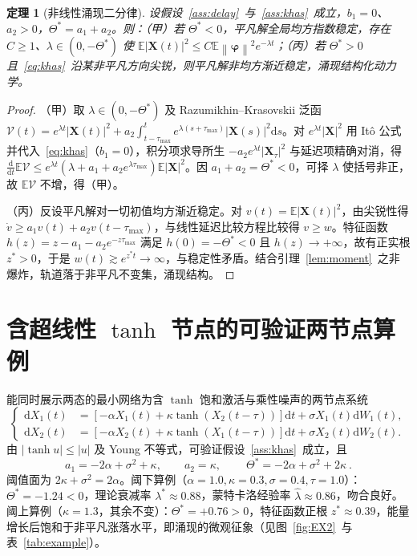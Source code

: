 \documentclass[12pt,a4paper]{ctexart}
\newcommand{\kai}[1]{{\CJKfamily{kai}#1}}
\newtheorem{theorem}{定理}
\newcommand{\E}{\mathbb{E}}
\newcommand{\dd}{\mathrm{d}}
\newcommand{\norm}[1]{\left\lVert #1 \right\rVert}
\newcommand{\abs}[1]{\left\lvert #1 \right\rvert}
\newcommand{\X}{\mathbf{X}}
\begin{document}
\begin{theorem}[非线性涌现二分律]\label{thm:nonlinear}
设假设~\ref{ass:delay}~与~\ref{ass:khas}~成立，$b_1=0$、$a_2>0$，$\Theta^{\ast}=a_1+a_2$。则：（甲）若 $\Theta^{\ast}<0$，平凡解全局均方指数稳定，存在 $C\ge1$、$\lambda\in(0,-\Theta^{\ast})$ 使 $\E\abs{\X(t)}^2\le C\E\norm{\bm{\varphi}}^2 e^{-\lambda t}$；（丙）若 $\Theta^{\ast}>0$ 且~\eqref{eq:khas}~沿某非平凡方向尖锐，则平凡解非均方渐近稳定，涌现结构化动力学。
\end{theorem}

\begin{proof}
\kai{（甲）}取 $\lambda\in(0,-\Theta^\ast)$ 及 Razumikhin–Krasovskii 泛函
$\mathcal{V}(t)=e^{\lambda t}\abs{\X(t)}^2+a_2\int_{t-\tau_{\max}}^{t}e^{\lambda(s+\tau_{\max})}\abs{\X(s)}^2\dd s$。对 $e^{\lambda t}\abs{\X}^2$ 用 Itô 公式并代入~\eqref{eq:khas}（$b_1=0$），积分项求导所生 $-a_2e^{\lambda t}\abs{\X_\tau}^2$ 与延迟项\kai{精确对消}，得 $\tfrac{\dd}{\dd t}\E\mathcal{V}\le e^{\lambda t}(\lambda+a_1+a_2 e^{\lambda\tau_{\max}})\E\abs{\X}^2$。因 $a_1+a_2=\Theta^\ast<0$，可择 $\lambda$ 使括号非正，故 $\E\mathcal{V}$ 不增，得（甲）。

\kai{（丙）}反设平凡解对一切初值均方渐近稳定。对 $v(t)=\E\abs{\X(t)}^2$，由尖锐性得 $\dot v\ge a_1 v(t)+a_2 v(t-\tau_{\max})$，与线性延迟比较方程比较得 $v\ge w$。特征函数 $h(z)=z-a_1-a_2 e^{-z\tau_{\max}}$ 满足 $h(0)=-\Theta^\ast<0$ 且 $h(z)\to+\infty$，故有正实根 $z^\ast>0$，于是 $w(t)\gtrsim e^{z^\ast t}\to\infty$，与稳定性矛盾。结合引理~\ref{lem:moment}~之非爆炸，轨道落于非平凡不变集，涌现结构。
\end{proof}

\section{含超线性 $\tanh$ 节点的可验证两节点算例}\label{sec:example}

\hspace{2em}能同时展示两态的最小网络为含 $\tanh$ 饱和激活与乘性噪声的两节点系统
\begin{equation}\label{eq:twonode}
\left\{
\begin{aligned}
\dd X_1(t)&=[-\alpha X_1(t)+\kappa\tanh(X_2(t-\tau))]\dd t+\sigma X_1(t)\dd W_1(t),\\
\dd X_2(t)&=[-\alpha X_2(t)+\kappa\tanh(X_1(t-\tau))]\dd t+\sigma X_2(t)\dd W_2(t).
\end{aligned}\right.
\end{equation}
由 $\abs{\tanh u}\le\abs{u}$ 及 Young 不等式，可验证假设~\ref{ass:khas}~成立，且
\begin{equation}\label{eq:example-consts}
a_1=-2\alpha+\sigma^2+\kappa,\qquad a_2=\kappa,\qquad\boxed{\ \Theta^\ast=-2\alpha+\sigma^2+2\kappa\ }.
\end{equation}
阈值面为 $2\kappa+\sigma^2=2\alpha$。\kai{阈下算例}（$\alpha=1.0,\kappa=0.3,\sigma=0.4,\tau=1.0$）：$\Theta^\ast=-1.24<0$，理论衰减率 $\lambda^\ast\approx0.88$，蒙特卡洛经验率 $\hat\lambda\approx0.86$，吻合良好。\kai{阈上算例}（$\kappa=1.3$，其余不变）：$\Theta^\ast=+0.76>0$，特征函数正根 $z^\ast\approx0.39$，能量增长后饱和于非平凡涨落水平，即涌现的微观征象（见图~\ref{fig:EX2}~与表~\ref{tab:example}）。
\end{document}
